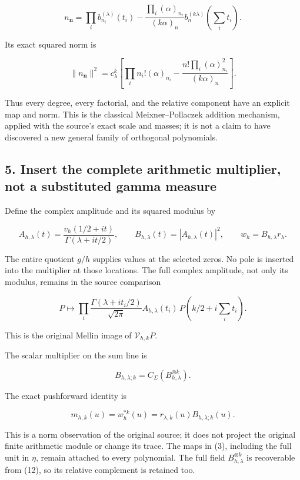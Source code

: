 \[
n_{\mathbf n}=\prod_i b_{n_i}^{(\lambda)}(t_i)
 -\frac{\prod_i(\alpha)_{n_i}}{(k\alpha)_n}
                    b_n^{(k\lambda)}(\sum_i t_i).
\]

Its exact squared norm is

\[
\boxed{
\|n_{\mathbf n}\|^2
=c_\lambda^k\left[
\prod_i n_i!(\alpha)_{n_i}
 -\frac{n!\prod_i(\alpha)_{n_i}^2}{(k\alpha)_n}
\right].
}                                                                   \tag{16}
\]

Thus every degree, every factorial, and the relative component have an explicit map and norm. This
is the classical Meixner--Pollaczek addition mechanism, applied with the source's exact scale and
masses; it is not a claim to have discovered a new general family of orthogonal polynomials.

\subsection{5. Insert the complete arithmetic multiplier, not a substituted gamma
measure}\label{gamma_convolution:insert-the-complete-arithmetic-multiplier-not-a-substituted-gamma-measure}

Define the complex amplitude and its squared modulus by

\[
A_{h,\lambda}(t)
=\frac{v_h(1/2+it)}{\Gamma(\lambda+it/2)},\qquad
B_{h,\lambda}(t)=|A_{h,\lambda}(t)|^2,
\qquad w_h=B_{h,\lambda}r_\lambda.                                 \tag{17}
\]

The entire quotient \(g/h\) supplies values at the selected zeros. No pole is inserted into the
multiplier at those locations. The full complex amplitude, not only its modulus, remains in the
source comparison

\[
P\longmapsto
\prod_i\frac{\Gamma(\lambda+it_i/2)}{\sqrt{2\pi}}
 A_{h,\lambda}(t_i)\,P(k/2+i\sum_i t_i).
                                                                    \tag{18}
\]

This is the original Mellin image of \(\mathcal V_{h,k}P\).

The scalar multiplier on the sum line is

\[
B_{h,\lambda;k}=C_\Sigma(B_{h,\lambda}^{\otimes k}).
\]

The exact pushforward identity is

\[
\boxed{
 m_{h,k}(u)=w_h^{*k}(u)=r_{\lambda,k}(u)B_{h,\lambda;k}(u).
}                                                                   \tag{19}
\]

This is a norm observation of the original source; it does not project the original finite
arithmetic module or change its trace. The maps in (3), including the full unit in \(\eta\), remain
attached to every polynomial. The full field \(B_{h,\lambda}^{\otimes k}\) is recoverable from (12),
so its relative complement is retained too.

